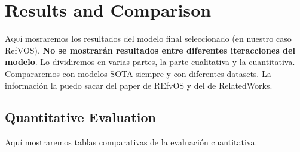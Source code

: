 

\chapter{Results and Comparison}\label{cha:results}



\lettrine{A}{quí} mosraremos los resultados del modelo final seleccionado (en
nuestro caso RefVOS). \textbf{No se mostrarán resultados entre diferentes
  iteracciones del modelo}. Lo dividiremos en varias partes, la parte
cualitativa y la cuantitativa. Compararemos con modelos SOTA siempre y con
diferentes datasets. La información la puedo sacar del paper de REfvOS y del de
RelatedWorks.



\section{Quantitative Evaluation}\label{sec:quantitative-eval}

Aquí mostraremos tablas comparativas de la evaluación cuantitativa.


